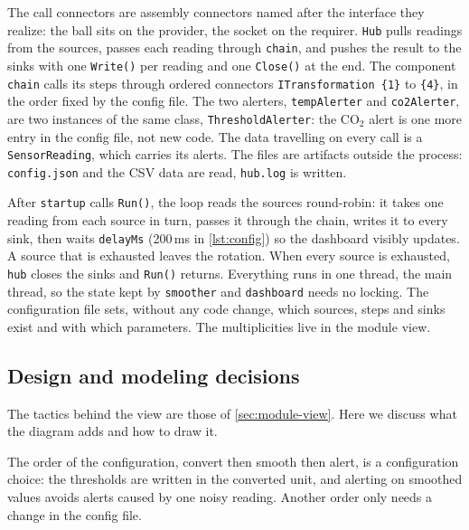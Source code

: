 \documentclass[../main-en.tex]{subfiles}
\begin{document}
The call connectors are assembly connectors named after the interface they
realize: the ball sits on the provider, the socket on the requirer.
\texttt{Hub} pulls readings from the sources, passes each reading through
\texttt{chain}, and pushes the result to the sinks with one
\texttt{Write()} per reading and one \texttt{Close()} at the end.
The component \texttt{chain} calls its steps through ordered connectors
\texttt{ITransformation \{1\}} to \texttt{\{4\}}, in the order fixed by the
config file. The two alerters, \texttt{tempAlerter} and \texttt{co2Alerter},
are two instances of the same class, \texttt{ThresholdAlerter}: the CO$_2$
alert is one more entry in the config file, not new code. The data travelling on every call is a
\texttt{SensorReading}, which carries its alerts. The files are artifacts
outside the process: \texttt{config.json} and the CSV data are read,
\texttt{hub.log} is written.

After \texttt{startup} calls \texttt{Run()}, the loop reads the sources
round-robin: it takes one reading from each source in turn, passes it
through the chain, writes it to every sink, then waits \texttt{delayMs}
(200\,ms in \cref{lst:config}) so the dashboard visibly updates. A source
that is exhausted leaves the rotation. When every source is exhausted,
\texttt{hub} closes the sinks and \texttt{Run()} returns. Everything runs in one thread, the main thread, so
the state kept by \texttt{smoother} and \texttt{dashboard} needs no locking.
The configuration file sets, without any code change, which sources, steps
and sinks exist and with which parameters. The multiplicities live in the
module view.

\subsection{Design and modeling decisions}

The tactics behind the view are those of \cref{sec:module-view}. Here we
discuss what the diagram adds and how to draw it.

The order of the configuration, convert then smooth then alert, is
a configuration choice: the thresholds are written in the converted unit,
and alerting on smoothed values avoids alerts caused by one noisy reading.
Another order only needs a change in the config file.
\end{document}

